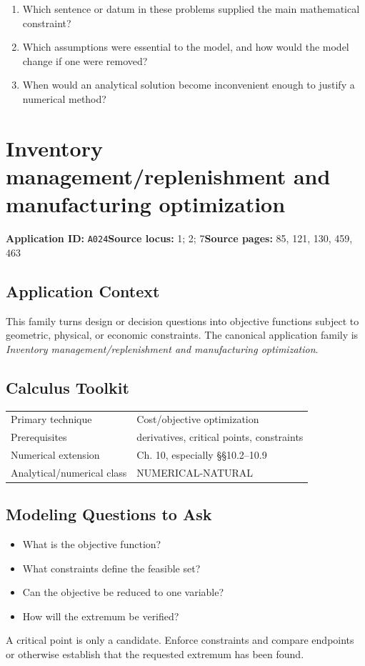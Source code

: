 \documentclass[11pt]{book}
\newcommand{\pid}[1]{\texttt{#1}}
\begin{document}
\begin{reflectionbox}\begin{enumerate}
\item Which sentence or datum in these problems supplied the main mathematical constraint?
\item Which assumptions were essential to the model, and how would the model change if one were removed?
\item When would an analytical solution become inconvenient enough to justify a numerical method?
\end{enumerate}\end{reflectionbox}
\chapter{Inventory management/replenishment and manufacturing optimization}\label{app:A024}
\textbf{Application ID:} \pid{A024}\quad \textbf{Source locus:} 1; 2; 7\quad \textbf{Source pages:} 85, 121, 130, 459, 463
\section*{Application Context}
This family turns design or decision questions into objective functions subject to geometric, physical, or economic constraints. The canonical application family is \emph{Inventory management/replenishment and manufacturing optimization}.
\section*{Calculus Toolkit}
\begin{tabularx}{\textwidth}{@{}lX@{}}\toprule
Primary technique & Cost/objective optimization \\
Prerequisites & derivatives, critical points, constraints \\
Numerical extension & Ch. 10, especially §§10.2–10.9 \\
Analytical/numerical class & NUMERICAL-NATURAL \\
\bottomrule\end{tabularx}
\section*{Modeling Questions to Ask}\begin{itemize}
\item What is the objective function?
\item What constraints define the feasible set?
\item Can the objective be reduced to one variable?
\item How will the extremum be verified?
\end{itemize}
\begin{errorbox}A critical point is only a candidate. Enforce constraints and compare endpoints or otherwise establish that the requested extremum has been found.\end{errorbox}
\end{document}

